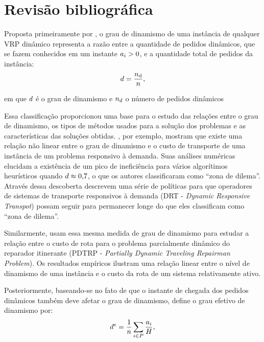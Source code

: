 \section{Revisão bibliográfica}\label{sec:medidas_revisao}

Proposta primeiramente por , o grau de dinamismo
de uma instância de qualquer VRP dinâmico representa a razão entre a quantidade
de pedidos dinâmicos, que se fazem conhecidos em um instante
$a_i > 0$, e a quantidade total de pedidos da instância:
%
\begin{equation}
  d = \frac{n_{\text{d}}}{n},
  \label{eq:degreeOfDynamism}
\end{equation}

\noindent em que $d$ é o grau de dinamismo e 
$n_{d}$ o número de pedidos dinâmicos

Essa classificação proporcionou uma base para o estudo das relações entre o 
grau de dinamismo, os tipos de métodos usados para a solução dos 
problemas e as características das soluções obtidas.
, por exemplo, mostram que existe uma relação não
linear entre o grau de dinamismo e o custo de transporte de uma instância de um
problema responsivo à demanda.
Suas análises numéricas elucidam a existência de um pico de ineficiência para
vários algorítimos heurísticos quando $d \approx 0{,}7$, o que
os autores classificaram como ``zona de dilema''.
Através dessa descoberta  descrevem uma série de
políticas para que operadores de sistemas de transporte responsivos à demanda
(DRT - \textit{Dynamic Responsive Transpot}) possam seguir para permanecer 
longe do que eles classificam como ``zona de dilema''.

Similarmente,  usam essa mesma medida de 
grau de dinamismo para estudar a relação entre o custo de rota para o 
problema parcialmente dinâmico do reparador itinerante 
(PDTRP - \textit{Partially Dynamic Traveling Repairman Problem}).
Os resultados empíricos ilustram uma relação linear entre o nível de
dinamismo de uma instância e o custo da rota de um sistema relativamente ativo.

Posteriormente, baseando-se no fato de que o instante de chegada dos pedidos
dinâmicos também deve afetar o grau de dinamismo,
\textcite{larsen_dynamic_2000} define o grau efetivo de dinamismo por:
%
\begin{equation}
  d^\text{e} = 
  \frac{1}{n}
  \sum_{i \in P}
  {
    \frac{a_i}{H}
  },
  \label{eq:eDegreeOfDynamism}
\end{equation}

